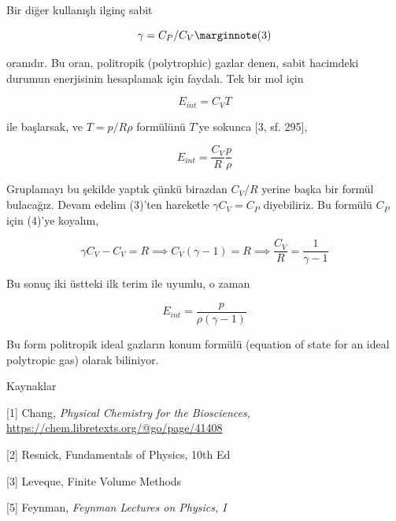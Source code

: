 \documentclass[12pt,fleqn]{article}\usepackage{../../common}
\begin{document}
Bir diğer kullanışlı ilginç sabit

$$
\gamma = C_P / C_V
\mlabel{3}
$$

oranıdır. Bu oran, politropik (polytrophic) gazlar denen, sabit hacimdeki
durumun enerjisinin hesaplamak için faydalı. Tek bir mol için

$$
E_{int} = C_V T
$$

ile başlarsak, ve $T = p / R\rho$ formülünü $T$'ye sokunca [3, sf. 295],

$$
E_{int} = \frac{C_V}{R} \frac{p}{\rho}
$$

Gruplamayı bu şekilde yaptık çünkü birazdan $C_V/R$ yerine başka bir formül
bulacağız. Devam edelim (3)'ten hareketle $\gamma C_V = C_P$ diyebiliriz. Bu
formülü $C_P$ için (4)'ye koyalım,

$$
\gamma C_V - C_V = R \implies C_V(\gamma-1) = R \implies \frac{C_V}{R} =
\frac{1}{\gamma-1}
$$

Bu sonuç iki üstteki ilk terim ile uyumlu, o zaman 

$$
E_{int} = \frac{p}{\rho (\gamma - 1)}
$$

Bu form politropik ideal gazların konum formülü (equation of state for an ideal
polytropic gas) olarak biliniyor.

Kaynaklar

[1] Chang, {\em Physical Chemistry for the Biosciences},
    \url{https://chem.libretexts.org/@go/page/41408}

[2] Resnick, Fundamentals of Physics, 10th Ed

[3] Leveque, Finite Volume Methods

[5] Feynman, {\em Feynman Lectures on Physics, I}
\end{document}
